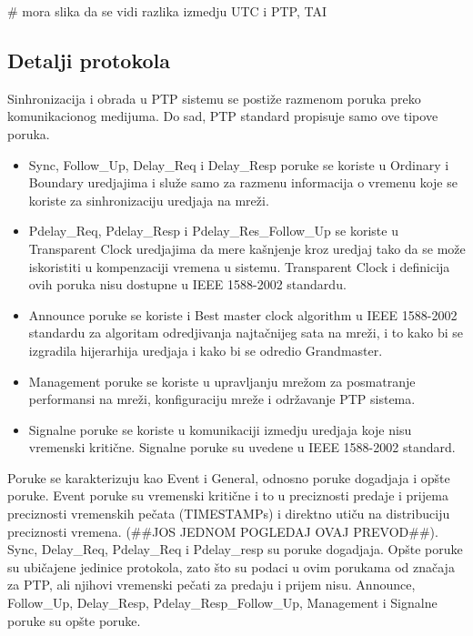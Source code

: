 \documentclass[a4paper,12pt, master]{etf}
\begin{document}
	\# mora slika da se vidi razlika izmedju UTC i PTP, TAI

	\subsection{Detalji protokola}

	Sinhronizacija i obrada u PTP sistemu se posti\v{z}e razmenom poruka preko
	komunikacionog medijuma. Do sad, PTP standard propisuje samo ove tipove
	poruka.

	\begin{itemize}
		\item Sync, Follow\_Up, Delay\_Req i Delay\_Resp poruke se koriste u
		Ordinary i Boundary uredjajima i slu\v{z}e samo za razmenu informacija
		o vremenu koje se koriste za sinhronizaciju uredjaja na mre\v{z}i.
		\item Pdelay\_Req, Pdelay\_Resp i Pdelay\_Res\_Follow\_Up se koriste u
		Transparent Clock uredjajima da mere ka\v{s}njenje kroz uredjaj tako da
		se mo\v{z}e iskoristiti u kompenzaciji vremena u sistemu. Transparent
		Clock i definicija ovih poruka nisu dostupne u IEEE 1588-2002 standardu.
		\item Announce poruke se koriste i Best master clock algorithm u IEEE
		1588-2002 standardu za algoritam odredjivanja najta\v{c}nijeg sata na
		mre\v{z}i, i to kako bi se izgradila hijerarhija uredjaja i kako bi se
		odredio Grandmaster.
		\item Management poruke se koriste u upravljanju mre\v{z}om za
		posmatranje performansi na mre\v{z}i, konfiguraciju mre\v{z}e i
		odr\v{z}avanje PTP sistema.
		\item Signalne poruke se koriste u komunikaciji izmedju uredjaja koje
		nisu vremenski kriti\v{c}ne. Signalne poruke su uvedene u IEEE
		1588-2002 standard.
	\end{itemize}

	Poruke se karakterizuju kao Event i General, odnosno poruke dogadjaja i
	op\v{s}te poruke. Event	poruke su vremenski kriti\v{c}ne i to u preciznosti
	predaje i prijema preciznosti vremenskih pe\v{c}ata (TIMESTAMPs) i direktno
	uti\v{c}u na distribuciju preciznosti vremena. (\#\#JOS JEDNOM POGLEDAJ
	OVAJ PREVOD\#\#). Sync, Delay\_Req, Pdelay\_Req i Pdelay\_resp su poruke
	dogadjaja. Op\v{s}te poruke su ubi\v{c}ajene jedinice protokola, zato
	\v{s}to su podaci u ovim porukama od zna\v{c}aja za PTP, ali njihovi
	vremenski pe\v{c}ati za predaju i prijem nisu. Announce, Follow\_Up,
	Delay\_Resp, Pdelay\_Resp\_Follow\_Up, Management i Signalne poruke su
	op\v{s}te poruke.
\end{document}
